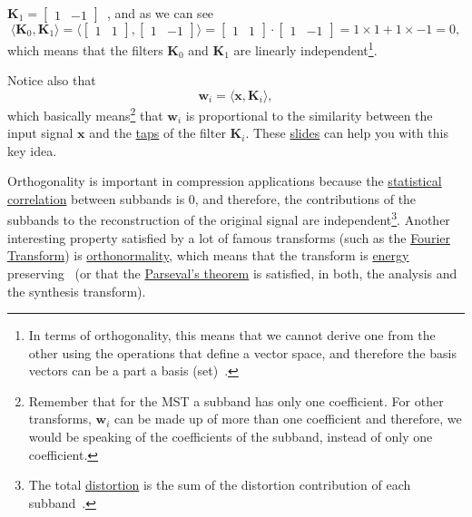 ${\mathbf K}_1=\begin{bmatrix} 1 & -1\end{bmatrix}$~, and as we can
see
\begin{equation}
  \langle {\mathbf K}_0,{\mathbf K}_1 \rangle =
  \langle \begin{bmatrix}
    1 & 1
  \end{bmatrix}
  ,
  \begin{bmatrix}
    1 & -1
  \end{bmatrix}
  \rangle =
  \begin{bmatrix}
    1 & 1
  \end{bmatrix}
  \cdot
  \begin{bmatrix}
    1 & -1
  \end{bmatrix}
   = 1\times 1 + 1\times -1 = 0,
\end{equation}
which means that the filters ${\mathbf K}_0$ and ${\mathbf K}_1$ are linearly
independent\footnote{In terms of orthogonality, this means that we
  cannot derive one from the other using the operations that define a
  vector space, and therefore the basis vectors can be a part a basis
  (set)~\cite{strang4linear}.}.

Notice also that
\begin{equation}
  {\mathbf w}_i = \langle {\mathbf x}, {\mathbf K}_i\rangle,
\end{equation}
which basically means\footnote{Remember that for the MST a subband has
  only one coefficient. For other transforms, ${\mathbf w}_i$ can be
  made up of more than one coefficient and therefore, we would be
  speaking of the coefficients of the subband, instead of only one
  coefficient.} that ${\mathbf w}_i$ is proportional to the similarity
between the input signal ${\mathbf x}$ and the
\href{https://en.wikipedia.org/wiki/Finite_impulse_response}{taps} of
the filter ${\mathbf K}_i$. These
\href{https://cseweb.ucsd.edu/classes/fa17/cse166-a/lec13.pdf}{slides}
can help you with this key idea.

Orthogonality is important in compression applications because the
\href{https://en.wikipedia.org/wiki/Correlation_and_dependence}{statistical
  correlation} between subbands is 0, and therefore, the contributions
of the subbands to the reconstruction of the original signal are
independent\footnote{The total
\href{https://en.wikipedia.org/wiki/Distortion}{distortion} is the sum
of the distortion contribution of each
subband~\cite{sayood2017introduction}.}. Another interesting property
satisfied by a lot of famous transforms (such as the
\href{https://en.wikipedia.org/wiki/Fourier_transform}{Fourier
  Transform}) is
\href{https://en.wikipedia.org/wiki/Orthonormality}{orthonormality},
which means that the transform is
\href{https://en.wikipedia.org/wiki/Energy_(signal_processing)}{energy}
preserving~\cite{sayood2017introduction} (or that the
\href{https://en.wikipedia.org/wiki/Parseval%27s_theorem}{Parseval's
  theorem} is satisfied, in both, the analysis and the synthesis
transform).

